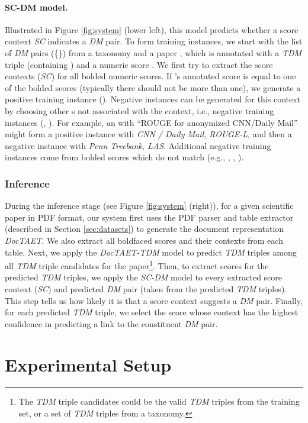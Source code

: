 \documentclass[11pt,a4paper]{article}
\begin{document}
\paragraph{SC-DM model.} Illustrated in Figure \ref{fig:system} (lower left), this model predicts whether a score context \emph{SC} indicates a \emph{DM} pair. 
To form training instances, we start with the list of \emph{DM} pairs (\{\}) from a taxonomy and a paper ,  which is annotated with a \emph{TDM} triple  (containing  ) and a numeric score . We first try to extract the score contexts (\emph{SC}) for all bolded numeric scores. If 's annotated score  is equal to one of the bolded scores  (typically there should not be more than one), we generate a positive training instance ().  Negative instances can be generated for this context by choosing other s not associated with the context, i.e.,   negative training instances (, ).
For example, an  with ``ROUGE for anonymized CNN/Daily Mail'' might form a positive instance with  \emph{CNN / Daily Mail, ROUGE-L}, and then a negative instance with  \emph{Penn Treebank, LAS}.
Additional negative training instances come from bolded scores  which do not match  (e.g., , , ). 

\subsubsection{Inference}
During the inference stage (see Figure \ref{fig:system} (right)), for a given scientific paper
in PDF format, our system first uses the PDF parser and table extractor (described in Section \ref{sec:datasets}) to generate the document representation \emph{DocTAET}. We also extract all boldfaced scores and their contexts from each table. Next, we apply the \emph{DocTAET-TDM} model to predict \emph{TDM} triples among all \emph{TDM}  triple candidates for the paper\footnote{The \emph{TDM} triple candidates could be the valid \emph{TDM}  triples from the training set, or a set of \emph{TDM} triples from a taxonomy.}. Then, to extract scores for the predicted \emph{TDM} triples, we apply the \emph{SC-DM} model to every extracted score context (\emph{SC}) and predicted \emph{DM} pair (taken from the predicted \emph{TDM} triples). This step tells us how likely it is that a score context suggests a \emph{DM} pair. Finally, for each predicted \emph{TDM} triple, we select the score whose context has the highest confidence in predicting a link to the constituent \emph{DM} pair.




\section{Experimental Setup}\label{sec:exp_setup}
\end{document}
